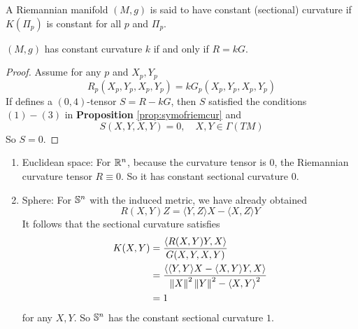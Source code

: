 \begin{enumerate}[label=\arabic{*}.]
	\begin{defn}
		A Riemannian manifold $(M,g)$ is said to have constant (sectional) curvature if $K(\Pi_p)$ is constant for all $p$ and $\Pi_p$.
	\end{defn}

	\begin{prop}
		$(M,g)$ has constant curvature $k$ if and only if $R=kG$.
	\end{prop}
	\begin{proof}
		Assume for any $p$ and $X_p,Y_p$
		\begin{equation*}
			R_p(X_p,Y_p,X_p,Y_p) = kG_p(X_p,Y_p,X_p,Y_p)
		\end{equation*}
		If defines a $(0,4)$-tensor $S = R - kG$, then $S$ satisfied the conditions $(1)-(3)$ in \textbf{Proposition} \ref{prop:symofriemcur} and
		\begin{equation*}
			S(X,Y,X,Y) = 0,\quad X,Y \in \Gamma(TM)
		\end{equation*}
		So $S=0$.
	\end{proof}

	\begin{exam}
		\begin{enumerate}[label=(\arabic{*})]
			\item Euclidean space: For $\mathbb{R}^n$, because the curvature tensor is $0$, the Riemannian curvature tensor $R \equiv 0$. So it has constant sectional curvature $0$.

			\item Sphere: For $\mathbb{S}^n$ with the induced metric, we have already obtained
			\begin{equation*}
				R(X,Y)Z = \langle Y, Z\rangle X-\langle X, Z\rangle Y
			\end{equation*}
			It follows that the sectional curvature satisfies
			\begin{equation*}
				\begin{aligned}
					K(X,Y) &= \frac{\left\langle R(X,Y)Y,X \right\rangle}{G(X,Y,X,Y)} \\
					&= \frac{\left\langle \langle Y, Y\rangle X-\langle X, Y\rangle Y,X \right\rangle}{\left\lVert X\right\lVert^2\left\lVert Y\right\lVert^2 - \left\langle X,Y \right\rangle^2} \\
					&= 1
				\end{aligned}
			\end{equation*}
			for any $X,Y$. So $\mathbb{S}^n$ has the constant sectional curvature $1$.


\end{enumerate}
\end{exam}
\end{enumerate}
